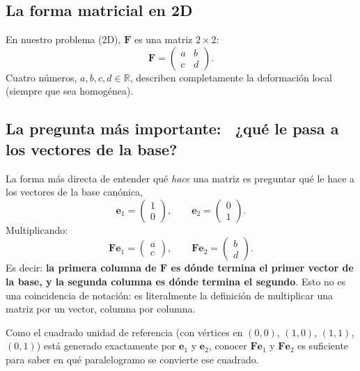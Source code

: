 \documentclass[11pt,a4paper]{article}
\newcommand{\R}{\mathbb{R}}
\begin{document}
\subsection{La forma matricial en 2D}

En nuestro problema (2D), $\bm F$ es una matriz $2\times2$:
\begin{equation}
 \bm F = \begin{pmatrix} a & b \\ c & d \end{pmatrix}.
 \label{eq:appB-F-matrix}
\end{equation}
Cuatro n\'umeros, $a,b,c,d\in\R$, describen completamente la
deformaci\'on local (siempre que sea homog\'enea).

\subsection{La pregunta m\'as importante: \ ¿qu\'e le pasa a los vectores de la base?}

La forma m\'as directa de entender qu\'e \emph{hace} una matriz es
preguntar qu\'e le hace a los vectores de la base can\'onica,
\begin{equation}
 \bm e_1=\begin{pmatrix}1\\0\end{pmatrix}, \qquad
 \bm e_2=\begin{pmatrix}0\\1\end{pmatrix}.
\end{equation}
Multiplicando:
\begin{equation}
 \bm F\bm e_1=\begin{pmatrix}a\\c\end{pmatrix}, \qquad
 \bm F\bm e_2=\begin{pmatrix}b\\d\end{pmatrix}.
 \label{eq:appB-Fe1Fe2}
\end{equation}
Es decir: \textbf{la primera columna de $\bm F$ es d\'onde termina el
primer vector de la base, y la segunda columna es d\'onde termina el
segundo}. Esto no es una coincidencia de notaci\'on: es literalmente
la definici\'on de multiplicar una matriz por un vector, columna por
columna.

Como el cuadrado unidad de referencia (con v\'ertices en $(0,0)$,
$(1,0)$, $(1,1)$, $(0,1)$) est\'a generado exactamente por $\bm e_1$ y
$\bm e_2$, conocer $\bm F\bm e_1$ y $\bm F\bm e_2$ es suficiente para
saber en qu\'e paralelogramo se convierte ese cuadrado.
\end{document}
